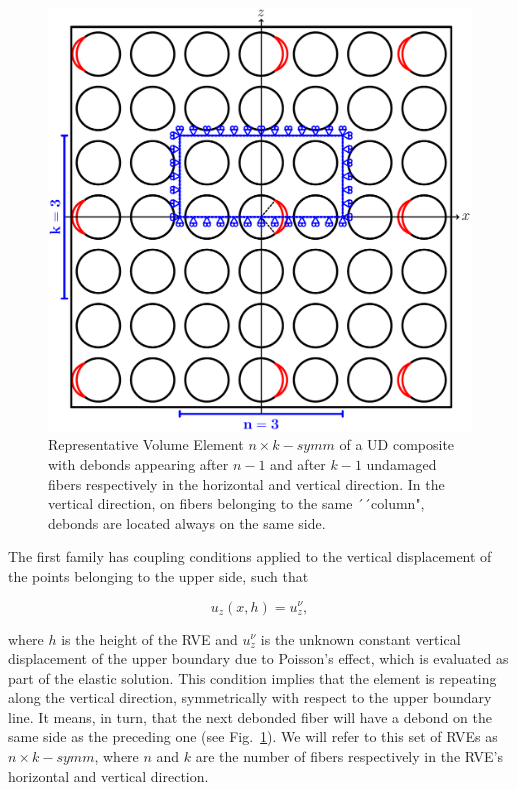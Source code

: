 \begin{figure}[!htb]
\centering
  \includegraphics[height=0.225\textheight]{paperD/coupling.pdf}
\caption{Representative Volume Element $n \times k-symm$ of a UD composite with debonds appearing after $n-1$ and after $k-1$ undamaged fibers respectively in the horizontal and vertical direction. In the vertical direction, on fibers belonging to the same ´´column", debonds are located always on the same side.}\label{paperD:fig:coupling-rve}
\end{figure}

The first family has coupling conditions applied to the vertical displacement of the points belonging to the upper side, such that

\begin{equation}
u_{z}\left(x,h\right)=u_{z}^{\nu},
\end{equation}

where $h$ is the height of the RVE and $u_{z}^{\nu}$ is the unknown constant vertical displacement of the upper boundary due to Poisson’s effect, which is evaluated as part of the elastic solution. This condition implies that the element is repeating along the vertical direction, symmetrically with respect to the upper boundary line. It means, in turn, that the next debonded fiber will have a debond on the same side as the preceding one (see Fig.~\ref{paperD:fig:coupling-rve}). We will refer to this set of RVEs as $n \times k-symm$, where $n$ and $k$ are the number of fibers respectively in the RVE’s horizontal and vertical direction.

